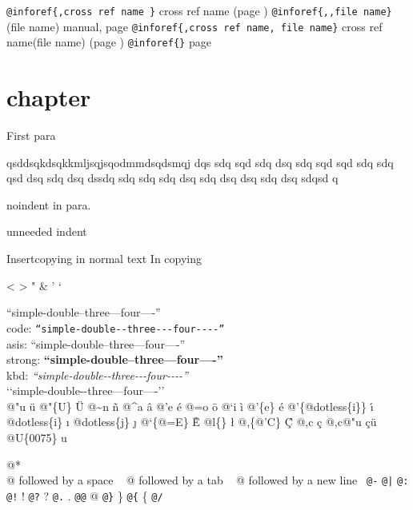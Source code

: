 \documentclass{book}
\newcommand{\GNUTexinfosetsingleheader}{\pagestyle{fancy}
\fancyhf{}
\lhead{\nouppercase{\leftmark}}
\rhead{\thepage}
}
\begin{document}
\begin{titlepage}
\texttt{@inforef\{,cross ref name \}} cross ref name (page \pageref{anchor:})
\texttt{@inforef\{,,file name\}} (file name) manual, page \pageref{anchor:}
\texttt{@inforef\{,cross ref name, file name\}} cross ref name(file name) (page \pageref{anchor:})
\texttt{@inforef\{\}} page \pageref{anchor:}


\end{titlepage}
\GNUTexinfosetsingleheader{}%
\mainmatter

\chapter{chapter}
\label{anchor:chapter}%

First para

\noindent{}qsddsqkdsqkkmljsqjsqodmmdsqdsmqj dqs sdq sqd sdq dsq sdq sqd sqd sdq sdq 
qsd dsq sdq dsq dssdq sdq sdq sdq dsq sdq dsq dsq sdq dsq sdqsd q

\noindent{}noindent in para.

unneeded indent

Insertcopying in normal text
In copying

<
>
"
\&
'
`

``simple-double--three---four----''\leavevmode{}\\
code: \texttt{``simple-double{-}{-}three{-}{-}{-}four{-}{-}{-}-''} \leavevmode{}\\
asis: ``simple-double--three---four----'' \leavevmode{}\\
strong: \textbf{``simple-double--three---four----''} \leavevmode{}\\
kbd: {\ttfamily\textsl{``simple-double{-}{-}three{-}{-}{-}four{-}{-}{-}-''}} \leavevmode{}\\

`\hbox{}`simple-double-\hbox{}-three---four----'\hbox{}'\leavevmode{}\\


@"u \"{u} 
@"\{U\} \"{U} 
@\~{}n \~{n}
@\^{}a \^{a}
@'e \'{e}
@=o \={o}
@`i \`{i}
@'\{e\} \'{e}
@'\{@dotless\{i\}\} \'{\i{}} 
@dotless\{i\} \i{}
@dotless\{j\} \j{}
@`\{@=E\} \`{\={E}} 
@l\{\} \l{}
@,\{@'C\} \c{\'{C}}
@,c \c{c}
@,c@"u \c{c}\"{u} \leavevmode{}\\

@U\{0075\} u

@* \leavevmode{}\\
@ followed by a space
\ {}
@ followed by a tab
\ {}
@ followed by a new line
\ {}\texttt{@-} \-{}
\texttt{@|} 
\texttt{@:} \@
\texttt{@!} \@!
\texttt{@?} \@?
\texttt{@.} \@.
\texttt{@@} @
\texttt{@\}} \}
\texttt{@\{} \{
\texttt{@/} 
\end{document}
